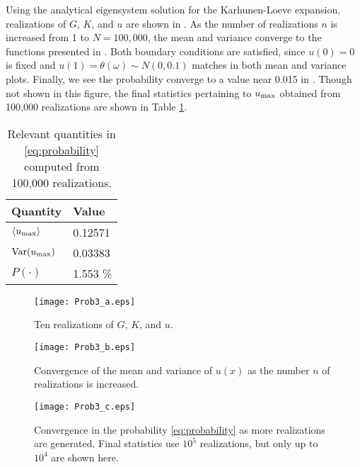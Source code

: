 \documentclass[11pt]{article}
\begin{document}
Using the analytical eigensystem solution for the Karhunen-Loeve expansion, realizations of $G$, $K$, and $u$ are shown in . As the number of realizations $n$ is increased from 1 to $N=100,\!000$, the mean and variance converge to the functions presented in . Both boundary conditions are satisfied, since $u(0)=0$ is fixed and  $u(1) = \theta(\omega) \sim N(0,0.1)$ matches in both mean and variance plots. Finally, we see the probability converge to a value near 0.015 in . Though not shown in this figure, the final statistics pertaining to $u_{\text{max}}$ obtained from 100,000 realizations are shown in Table \ref{tbl:probabilities}.

\begin{table}[h]
\centering
\begin{tabular}{ll}
\toprule
Quantity & Value \\
\midrule
$\left\langle u_{\text{max}} \right\rangle$ & 0.12571 \\
$\operatorname{Var}(u_{\text{max}})$ & 0.03383 \\
$P(\cdot)$ & 1.553 \% \\
\bottomrule
\end{tabular}
\vspace{1em}
\caption{Relevant quantities in \eqref{eq:probability} computed from 100,000 realizations.}
\label{tbl:probabilities}
\end{table}

\begin{figure}[t]
\centering
\texttt{[image: Prob3\_a.eps]}
\caption{Ten realizations of $G$, $K$, and $u$.}
\label{fig:prob3a}
\end{figure}

\begin{figure}[b]
\centering
\texttt{[image: Prob3\_b.eps]}
\caption{Convergence of the mean and variance of $u(x)$ as the number $n$ of realizations is increased.}
\label{fig:prob3b}
\end{figure}

\begin{figure}[t]
\centering
\texttt{[image: Prob3\_c.eps]}
\vspace{1em}
\caption{Convergence in the probability \eqref{eq:probability} as more realizations are generated. Final statistics use $10^5$ realizations, but only up to $10^4$ are shown here.}
\label{fig:prob3c}
\end{figure}

\end{document}
